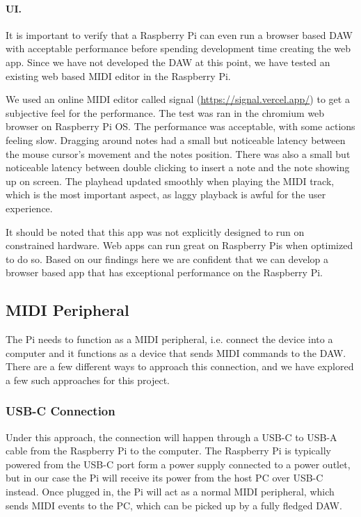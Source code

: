 \paragraph{UI.} It is important to verify that a Raspberry Pi can even run a browser based
DAW with acceptable performance before spending development time creating the web app.
Since we have not developed the DAW at this point, we have tested an existing web based
MIDI editor in the Raspberry Pi.

We used an online MIDI editor called signal (\url{https://signal.vercel.app/}) to get a
subjective feel for the performance. The test was ran in the chromium web browser on
Raspberry Pi OS. The performance was acceptable, with some actions feeling slow.
Dragging around notes had a small but noticeable latency between the mouse cursor's
movement and the notes position. There was also a small but noticeable latency between
double clicking to insert a note and the note showing up on screen. The playhead updated
smoothly when playing the MIDI track, which is the most important aspect, as laggy
playback is awful for the user experience.

It should be noted that this app was not explicitly designed to run on constrained
hardware. Web apps can run great on Raspberry Pis when optimized to do so. Based on our
findings here we are confident that we can develop a browser based app that has
exceptional performance on the Raspberry Pi.

\subsection{MIDI Peripheral}
\label{sec:midi_peripheral}

The Pi needs to function as a MIDI peripheral, i.e. connect the device into a computer and
it functions as a device that sends MIDI commands to the DAW. There are a few different
ways to approach this connection, and we have explored a few such approaches for this
project.


\subsubsection{USB-C Connection}

Under this approach, the connection will happen through a USB-C to USB-A cable from the
Raspberry Pi to the computer. The Raspberry Pi is typically powered from the USB-C port
form a power supply connected to a power outlet, but in our case the Pi will receive its
power from the host PC over USB-C instead. Once plugged in, the Pi will act as a normal
MIDI peripheral, which sends MIDI events to the PC, which can be picked up by a fully
fledged DAW.

